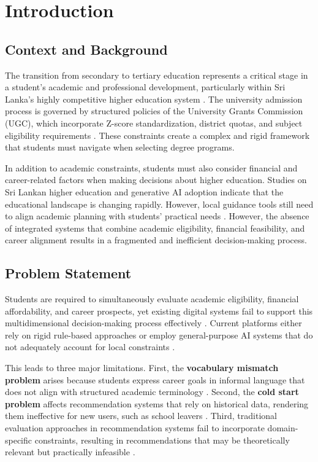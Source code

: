 \documentclass[conference]{IEEEtran}
\begin{document}
\thispagestyle{firstpagefooter}

\section{Introduction}

\subsection{Context and Background}
The transition from secondary to tertiary education represents a critical stage in a student's academic and professional development, particularly within Sri Lanka's highly competitive higher education system \cite{island2025admission, colombo2021admission}. The university admission process is governed by structured policies of the University Grants Commission (UGC), which incorporate Z-score standardization, district quotas, and subject eligibility requirements \cite{ugc2024overview, seu2024stream}. These constraints create a complex and rigid framework that students must navigate when selecting degree programs.

In addition to academic constraints, students must also consider financial and career-related factors when making decisions about higher education. Studies on Sri Lankan higher education and generative AI adoption indicate that the educational landscape is changing rapidly. However, local guidance tools still need to align academic planning with students' practical needs \cite{springer2024genai_sl, sljssh2021online, cmb2025ai_nursing}. However, the absence of integrated systems that combine academic eligibility, financial feasibility, and career alignment results in a fragmented and inefficient decision-making process.

\subsection{Problem Statement}
Students are required to simultaneously evaluate academic eligibility, financial affordability, and career prospects, yet existing digital systems fail to support this multidimensional decision-making process effectively \cite{silva2026systematic, manouselis2021recommendation, jamil2021review}. Current platforms either rely on rigid rule-based approaches or employ general-purpose AI systems that do not adequately account for local constraints \cite{almadani2023recommender, springer2024genai_sl}.

This leads to three major limitations. First, the \textbf{vocabulary mismatch problem} arises because students express career goals in informal language that does not align with structured academic terminology \cite{almadani2023recommender}. Second, the \textbf{cold start problem} affects recommendation systems that rely on historical data, rendering them ineffective for new users, such as school leavers \cite{tarus2018matrix, bakhshinategh2023course, zheng2025enhancing, alghamdi2021collaborative}. Third, traditional evaluation approaches in recommendation systems fail to incorporate domain-specific constraints, resulting in recommendations that may be theoretically relevant but practically infeasible \cite{zhang2022state, wang2018research}.
\end{document}
